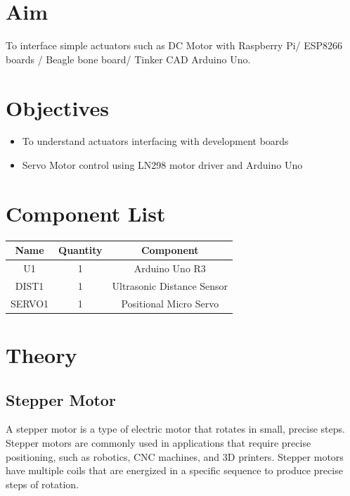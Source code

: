 \documentclass[11pt]{article}
\begin{document}
\tableofcontents
\thispagestyle{empty}
\clearpage

\setcounter{page}{1}

\section{Aim}
To interface simple actuators such as DC Motor with Raspberry Pi/ ESP8266 boards / Beagle bone board/ Tinker CAD Arduino Uno.

\section{Objectives}
\begin{itemize}
	\item To understand actuators interfacing with development boards
	\item Servo Motor control using LN298 motor driver and Arduino Uno
\end{itemize}

\section{Component List}
\begin{table}[H]
	\begin{tabular}{|c|c|c|}
		\hline
		\textbf{Name} & \textbf{Quantity} & \textbf{Component}         \\ \hline
		U1            & 1                 & Arduino Uno R3             \\ \hline
		DIST1         & 1                 & Ultrasonic Distance Sensor \\ \hline
		SERVO1        & 1                 & Positional Micro Servo     \\ \hline
	\end{tabular}
\end{table}
\section{Theory}
\subsection{Stepper Motor}

A stepper motor is a type of electric motor that rotates in small,
precise steps. Stepper motors are commonly used in applications that
require precise positioning, such as robotics, CNC machines, and 3D
printers. Stepper motors have multiple coils that are energized in a
specific sequence to produce precise steps of rotation.\\
\end{document}
